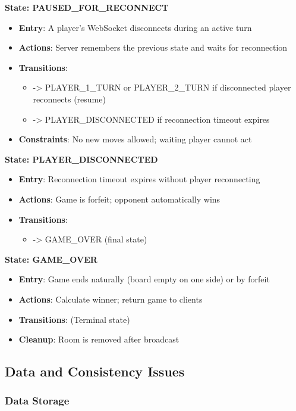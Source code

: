 \documentclass{scrartcl}
\begin{document}
\textbf{State: PAUSED\_FOR\_RECONNECT}
\begin{itemize}
  \item \textbf{Entry}: A player's WebSocket disconnects during an active turn
  \item \textbf{Actions}: Server remembers the previous state and waits for reconnection
  \item \textbf{Transitions}:
  \begin{itemize}
    \item -> PLAYER\_1\_TURN or PLAYER\_2\_TURN if disconnected player reconnects (resume)
    \item -> PLAYER\_DISCONNECTED if reconnection timeout expires
  \end{itemize}
  \item \textbf{Constraints}: No new moves allowed; waiting player cannot act
\end{itemize}

\textbf{State: PLAYER\_DISCONNECTED}
\begin{itemize}
  \item \textbf{Entry}: Reconnection timeout expires without player reconnecting
  \item \textbf{Actions}: Game is forfeit; opponent automatically wins
  \item \textbf{Transitions}:
  \begin{itemize}
    \item -> GAME\_OVER (final state)
  \end{itemize}
\end{itemize}

\textbf{State: GAME\_OVER}
\begin{itemize}
  \item \textbf{Entry}: Game ends naturally (board empty on one side) or by forfeit
  \item \textbf{Actions}: Calculate winner; return game to clients
  \item \textbf{Transitions}: (Terminal state)
  \item \textbf{Cleanup}: Room is removed after broadcast
\end{itemize}


\subsection{Data and Consistency Issues}\label{data-and-consistency-issues}

\subsubsection{Data Storage}
\end{document}
